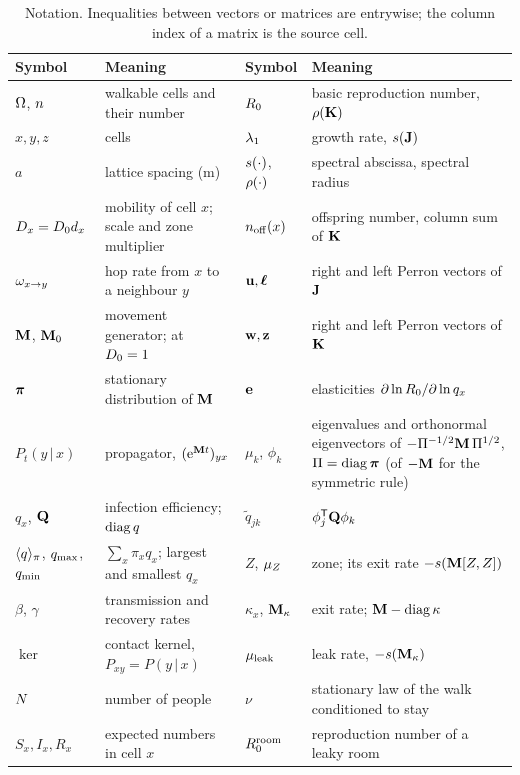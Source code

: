 \begin{table}[tbp]
  \centering\footnotesize
  \caption{Notation. Inequalities between vectors or matrices are entrywise; the column index of a matrix is
  the source cell.}
  \label{appD_tables:tab:notation}
  \setlength{\tabcolsep}{4pt}
  \begin{tabular}{@{}l>{\raggedright\arraybackslash}p{}l>{\raggedright\arraybackslash}p{}@{}}
    \toprule
    Symbol & Meaning & Symbol & Meaning \\
    \midrule
    $\Omega$, $n$ & walkable cells and their number & $R_0$ & basic reproduction number, $\rho(\mathbf{K})$ \\
    $x,y,z$ & cells & $\lambda_1$ & growth rate, $s(\mathbf{J})$ \\
    $a$ & lattice spacing (m) & $s(\cdot)$, $\rho(\cdot)$ & spectral abscissa, spectral radius \\
    $D_x=D_0 d_x$ & mobility of cell $x$; scale and zone multiplier & $n_{\mathrm{off}}(x)$ & offspring number, column sum of $\mathbf{K}$ \\
    $\omega_{x\to y}$ & hop rate from $x$ to a neighbour $y$ & $\mathbf{u},\boldsymbol{\ell}$ & right and left Perron vectors of $\mathbf{J}$ \\
    $\mathbf{M}$, $\mathbf{M}_0$ & movement generator; at $D_0=1$ & $\mathbf{w},\mathbf{z}$ & right and left Perron vectors of $\mathbf{K}$ \\
    $\boldsymbol{\pi}$ & stationary distribution of $\mathbf{M}$ & $\mathbf{e}$ & elasticities $\partial\ln R_0/\partial\ln q_x$ \\
    $P_t(y\,|\,x)$ & propagator, $(\mathrm{e}^{\mathbf{M} t})_{yx}$ & $\mu_k$, $\phi_k$ & eigenvalues and orthonormal eigenvectors of $-\Pi^{-1/2}\mathbf{M}\,\Pi^{1/2}$, $\Pi=\operatorname{diag}\boldsymbol{\pi}$ (of $-\mathbf{M}$ for the symmetric rule) \\
    $q_x$, $\mathbf{Q}$ & infection efficiency; $\operatorname{diag} q$ & $\tilde q_{jk}$ & $\phi_j^{\mathsf{T}}\mathbf{Q}\phi_k$ \\
    $\langle q\rangle_{\pi}$, $q_{\max}$, $q_{\min}$ & $\sum_x\pi_xq_x$; largest and smallest $q_x$ & $Z$, $\mu_Z$ & zone; its exit rate $-s(\mathbf{M}[Z,Z])$ \\
    $\beta$, $\gamma$ & transmission and recovery rates & $\kappa_x$, $\mathbf{M}_{\kappa}$ & exit rate; $\mathbf{M}-\operatorname{diag}\kappa$ \\
    $\ker$ & contact kernel, $P_{xy}=P(y\,|\,x)$ & $\mu_{\mathrm{leak}}$ & leak rate, $-s(\mathbf{M}_{\kappa})$ \\
    $N$ & number of people & $\nu$ & stationary law of the walk conditioned to stay \\
    $S_x,I_x,R_x$ & expected numbers in cell $x$ & $R_0^{\mathrm{room}}$ & reproduction number of a leaky room \\

\end{tabular}
\end{table}

